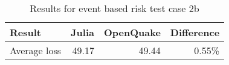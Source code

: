 \begin{table}[htbp]

\centering
\begin{tabular}{ l r r r }

\hline
\rowcolor{anti-flashwhite}
\bf{Result} & \bf{Julia} & \bf{OpenQuake} & \bf{Difference}\\
\hline
Average loss & 49.17 & 49.44 & 0.55\% \\
\hline
\end{tabular}

\caption{Results for event based risk test case 2b}
\label{tab:result-ebr-2b}
\end{table}